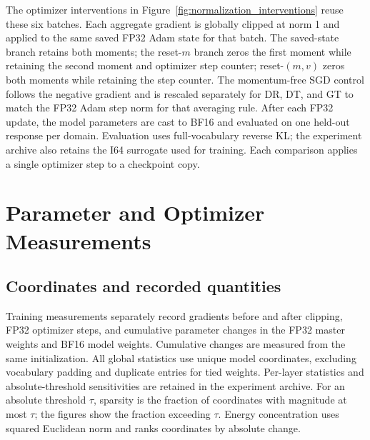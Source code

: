 The optimizer interventions in Figure~\ref{fig:normalization_interventions} reuse these six batches. Each aggregate gradient is globally clipped at norm 1 and applied to the same saved FP32 Adam state for that batch. The saved-state branch retains both moments; the reset-$m$ branch zeros the first moment while retaining the second moment and optimizer step counter; reset-$(m,v)$ zeros both moments while retaining the step counter. The momentum-free SGD control follows the negative gradient and is rescaled separately for DR, DT, and GT to match the FP32 Adam step norm for that averaging rule. After each FP32 update, the model parameters are cast to BF16 and evaluated on one held-out response per domain. Evaluation uses full-vocabulary reverse KL; the experiment archive also retains the I64 surrogate used for training. Each comparison applies a single optimizer step to a checkpoint copy.

\begin{table}[t]
\caption{\textbf{Response weighting changes gradient directions at equal domain weights.} Raw-gradient cosines on identical cached responses. DR and DT use equal domain loss weights; only DT weights responses by length.}
\label{tab:fixed_batch_normalization}
\centering\small

\end{table}

\section{Parameter and Optimizer Measurements}
\label{app:records}

\subsection{Coordinates and recorded quantities}

Training measurements separately record gradients before and after clipping, FP32 optimizer steps, and cumulative parameter changes in the FP32 master weights and BF16 model weights. Cumulative changes are measured from the same initialization. All global statistics use unique model coordinates, excluding vocabulary padding and duplicate entries for tied weights. Per-layer statistics and absolute-threshold sensitivities are retained in the experiment archive. For an absolute threshold $\tau$, sparsity is the fraction of coordinates with magnitude at most $\tau$; the figures show the fraction exceeding $\tau$. Energy concentration uses squared Euclidean norm and ranks coordinates by absolute change.

